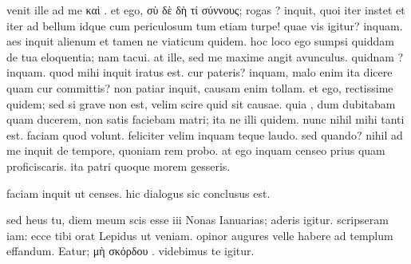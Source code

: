 


 venit ille ad me καὶ . et ego, σὺ δὲ δὴ τί σύννους; rogas ? inquit, quoi iter instet et iter ad bellum idque cum periculosum tum etiam turpe! quae vis igitur? inquam. aes inquit alienum et tamen ne viaticum quidem. hoc loco ego sumpsi quiddam de tua eloquentia; nam tacui. at ille, sed me maxime angit avunculus. quidnam ? inquam. quod mihi inquit iratus est. cur pateris? inquam, malo enim ita dicere quam cur committis? non patiar inquit, causam enim tollam. et ego, rectissime quidem; sed si grave non est, velim scire quid sit causae. quia , dum dubitabam quam ducerem, non satis faciebam matri; ita ne illi quidem. nunc nihil mihi tanti est. faciam quod volunt. feliciter velim inquam teque laudo. sed quando? nihil ad me inquit de tempore, quoniam rem probo. at ego inquam censeo prius quam proficiscaris. ita patri quoque morem gesseris.

 faciam inquit ut censes. hic dialogus sic conclusus est.

 sed heus tu, diem meum scis esse iii Nonas Ianuarias; aderis igitur. scripseram iam: ecce tibi orat Lepidus ut veniam. opinor augures velle habere ad templum effandum. Eatur; μὴ σκόρδου . videbimus te igitur.
